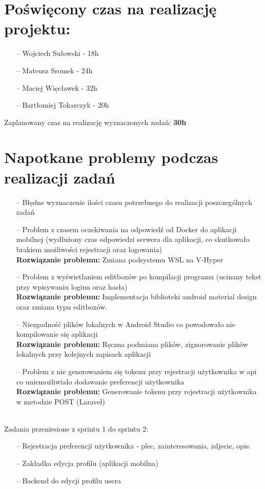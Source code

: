 \documentclass[12pt,a4paper]{article}
\begin{document}
\section{Poświęcony czas na realizację projektu:}
\begin{itemize}
    \item [--] Wojciech Sułowski  - 18h
    \item [--] Mateusz Sromek  - 24h
    \item [--] Maciej Więcławek - 32h
    \item [--] Bartłomiej Tokarczyk - 20h
\end{itemize}
Zaplanowany czas na realizację wyznaczonych zadań: \textbf{30h}

\section{ Napotkane problemy podczas realizacji zadań}
\begin{itemize}
    \item [--] Błędne wyznaczenie ilości czasu potrzebnego do realizacji poszczególnych  zadań
    \item [--] Problem z czasem oczekiwania na odpowiedź od Docker do aplikacji mobilnej (wydłużony czas odpowiedzi serwera dla aplikacji, co skutkowało brakiem możliwości rejestracji oraz logowania) \\
\textbf{Rozwiązanie problemu:} Zmiana podsystemu WSL na V-Hyper
 \item [--] Problem z wyświetlaniem editboxów po kompilacji programu (ucinany tekst przy wpisywaniu loginu oraz hasła)\\
 \textbf{Rozwiązanie problemu:} Implementacja biblioteki android material design oraz zmiana   typu editboxów.


  \item [--] Niezgodność plików lokalnych w Android Studio co powodowało nie kompilowanie się aplikacji \\
\textbf{Rozwiązanie problemu:} Ręczna podmiana plików, zignorowanie plików lokalnych przy kolejnych zapisach aplikacji
   \item [--] Problem z nie generowaniem się tokenu przy rejestracji użytkownika w api  co uniemożliwiało dodawanie preferencji użytkownika \\
\textbf{Rozwiązanie problemu:} Generowanie tokenu przy rejestracji użytkownika w metodzie POST (Laravel)

    \end{itemize}
    \\
    Zadania przeniesione z sprintu 1 do sprintu 2:
\begin{itemize}
 \item [--] Rejestracja preferencji użytkownika - plec, zainteresowania, zdjecie, opis.
 \item [--] Zakładka edycja profilu (aplikacji mobilna)
  \item [--] Backend do edycji profilu usera 
\end{itemize}
    
\end{document}
